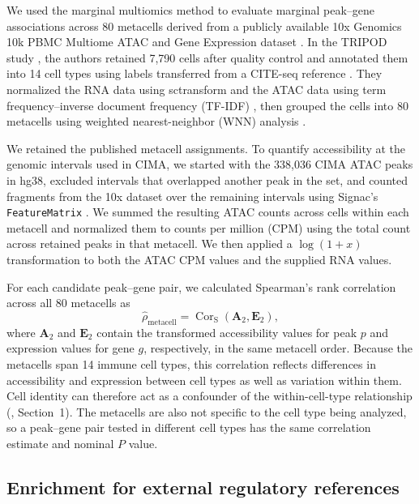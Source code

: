 We used the marginal multiomics method to evaluate marginal peak--gene associations across 80 metacells derived from a publicly available 10x Genomics 10k PBMC Multiome ATAC and Gene Expression dataset \cite{tenx2020pbmc10k}. In the TRIPOD study \cite{jiang2022tripod}, the authors retained 7,790 cells after quality control and annotated them into 14 cell types using labels transferred from a CITE-seq reference \cite{hao2021seurat}. They normalized the RNA data using sctransform \cite{hafemeister2019sctransform} and the ATAC data using term frequency--inverse document frequency (TF-IDF) \cite{stuart2021signac}, then grouped the cells into 80 metacells using weighted nearest-neighbor (WNN) analysis \cite{hao2021seurat}.

\noindent We retained the published metacell assignments. To quantify accessibility at the genomic intervals used in CIMA, we started with the 338,036 CIMA ATAC peaks in hg38, excluded intervals that overlapped another peak in the set, and counted fragments from the 10x dataset over the remaining intervals using Signac's \texttt{FeatureMatrix} \cite{stuart2021signac}. We summed the resulting ATAC counts across cells within each metacell and normalized them to counts per million (CPM) using the total count across retained peaks in that metacell. We then applied a $\log(1+x)$ transformation to both the ATAC CPM values and the supplied RNA values.

\noindent For each candidate peak--gene pair, we calculated Spearman's rank correlation across all 80 metacells as
\begin{equation*}
\widehat{\rho}_{\mathrm{metacell}} =
\operatorname{Cor}_{\mathrm{S}}\left(
\boldsymbol{A}_2,
\boldsymbol{E}_2
\right),
\end{equation*}
where $\boldsymbol{A}_2$ and $\boldsymbol{E}_2$ contain the transformed accessibility values for peak $p$ and expression values for gene $g$, respectively, in the same metacell order. Because the metacells span 14 immune cell types, this correlation reflects differences in accessibility and expression between cell types as well as variation within them. Cell identity can therefore act as a confounder of the within-cell-type relationship (, Section~1). The metacells are also not specific to the cell type being analyzed, so a peak--gene pair tested in different cell types has the same correlation estimate and nominal $P$ value.

\subsection{Enrichment for external regulatory references}
\label{sec:hyper}

